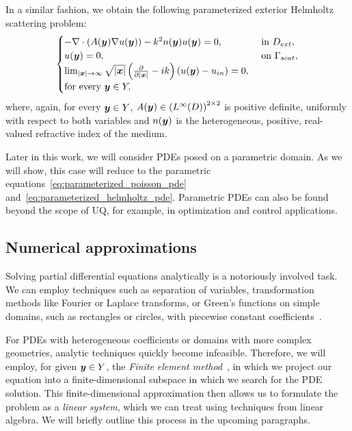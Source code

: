 In a similar fashion, we obtain the following parameterized exterior Helmholtz scattering problem:
\begin{equation}
    \begin{cases}
        -\nabla \cdot \left( A({\bm{y}}) \nabla u({\bm{y}}) \right)-k^2 n({\bm{y}})u({\bm{y}}) = 0, &\text{ in } D_{ext},\\
        u({\bm{y}}) = 0, & \text{ on } \Gamma_{scat},\\
        \lim_{|{{\bm{x}}}|\to \infty} \sqrt {|{{\bm{x}}}|} \left( \frac{\partial}{\partial |{{\bm{x}}}|}  - ik\right) \left( u({\bm{y}}) - u_{in} \right) = 0,\\
        \text{for every }{\bm{y}}\in Y,
    \end{cases}\label{eq:parameterized_helmholtz_pde}
\end{equation}
where, again, for every ${\bm{y}} \in Y$, $A({\bm{y}}) \in \left(L^\infty(D)\right)^{2\times 2}$ is positive definite, uniformly with respect to both variables and $n({\bm{y}})$ is the heterogeneous, positive, real-valued refractive index of the medium.

Later in this work, we will consider PDEs posed on a parametric domain.
As we will show, this case will reduce to the parametric equations~\eqref{eq:parameterized_poisson_pde} and~\eqref{eq:parameterized_helmholtz_pde}.
Parametric PDEs can also be found beyond the scope of UQ, for example, in optimization and control applications.

\subsection{Numerical approximations}\label{subsec:finite-element-approximations}
Solving partial differential equations analytically is a notoriously involved task.
We can employ techniques such as separation of variables, transformation methods like Fourier or Laplace transforms, or Green's functions on simple domains, such as rectangles or circles, with piecewise constant coefficients~\cite[Chapters~2 and~4]{evans2010}.

For PDEs with heterogeneous coefficients or domains with more complex geometries, analytic techniques quickly become infeasible.
Therefore, we will employ, for given ${\bm{y}}\in Y$, the \emph{Finite element method}~\cite{brenner2008}, in which we project our equation into a finite-dimensional subspace in which we search for the PDE solution.
This finite-dimensional approximation then allows us to formulate the problem as a \emph{linear system}, which we can treat using techniques from linear algebra.
We will briefly outline this process in the upcoming paragraphs.

